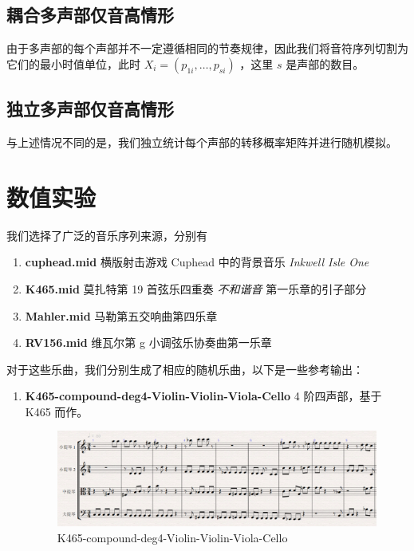 \documentclass[11pt]{article}
\begin{document}
\subsection{耦合多声部仅音高情形}
由于多声部的每个声部并不一定遵循相同的节奏规律，因此我们将音符序列切割为它们的最小时值单位，此时 $X_i=(p_{1i}, \dots, p_{si})$ ，这里 $s$ 是声部的数目。
\subsection{独立多声部仅音高情形}
与上述情况不同的是，我们独立统计每个声部的转移概率矩阵并进行随机模拟。

\section{数值实验}
我们选择了广泛的音乐序列来源，分别有
\begin{enumerate}
\item \textbf{cuphead.mid} 横版射击游戏 Cuphead 中的背景音乐 \emph{Inkwell Isle One}
\item \textbf{K465.mid} 莫扎特第 19 首弦乐四重奏 \emph{不和谐音} 第一乐章的引子部分
\item \textbf{Mahler.mid} 马勒第五交响曲第四乐章
\item \textbf{RV156.mid} 维瓦尔第 g 小调弦乐协奏曲第一乐章
\end{enumerate}
对于这些乐曲，我们分别生成了相应的随机乐曲，以下是一些参考输出：
\begin{enumerate}
\item \textbf{K465-compound-deg4-Violin-Violin-Viola-Cello} 4 阶四声部，基于 K465 而作。
\begin{figure}[hptb]
	\centering
	\label{fig:K465-compound-deg4-Violin-Violin-Viola-Cello}
	\includegraphics[width=\textwidth]{pic/K465-compound-deg4-Violin-Violin-Viola-Cello.eps}
	\caption{K465-compound-deg4-Violin-Violin-Viola-Cello}
\end{figure}
\end{enumerate}



\end{document}
